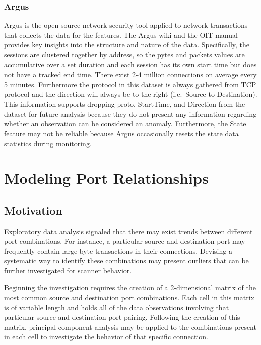 \documentclass[12pt,twoside]{dukestatscithesis}
\theoremstyle{definition}
\theoremstyle{definition}
\theoremstyle{definition}
\theoremstyle{remark}
\begin{document}
\subsection{Argus}\label{argus}

Argus is the open source network security tool applied to network
transactions that collects the data for the features. The Argus wiki and
the OIT manual provides key insights into the structure and nature of
the data. Specifically, the sessions are clustered together by address,
so the pytes and packets values are accumulative over a set duration and
each session has its own start time but does not have a tracked end
time. There exist 2-4 million connections on average every 5 minutes.
Furthermore the protocol in this dataset is always gathered from TCP
protocol and the direction will always be to the right (i.e.~Source to
Destination). This information supports dropping proto, StartTime, and
Direction from the dataset for future analysis because they do not
present any information regarding whether an observation can be
considered an anomaly. Furthermore, the State feature may not be
reliable because Argus occasionally resets the state data statistics
during monitoring.

\chapter{Modeling Port Relationships}\label{modeling-port-relationships}

\section{Motivation}\label{motivation}

Exploratory data analysis signaled that there may exist trends between
different port combinations. For instance, a particular source and
destination port may frequently contain large byte transactions in their
connections. Devising a systematic way to identify these combinations
may present outliers that can be further investigated for scanner
behavior.

Beginning the investigation requires the creation of a 2-dimensional
matrix of the most common source and destination port combinations. Each
cell in this matrix is of variable length and holds all of the data
observations involving that particular source and destination port
pairing. Following the creation of this matrix, principal component
analysis may be applied to the combinations present in each cell to
investigate the behavior of that specific connection.
\end{document}

